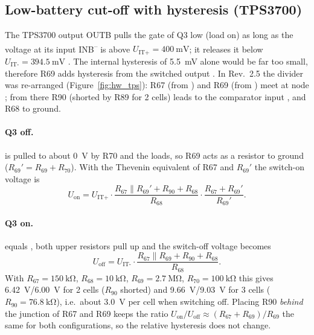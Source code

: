\begin{otherlanguage}{english}
\subsection{Low-battery cut-off with hysteresis (TPS3700)}
\label{sec:hw_tps}
The TPS3700 output OUTB pulls the gate of Q3 low (load on) as long as the voltage at its input
INB\textsuperscript{--} is above $U_\text{IT+}=\SI{400}{\milli\volt}$; it releases it below
$U_\text{IT-}=\SI{394.5}{\milli\volt}$ \cite{TI_TPS3700}. The internal hysteresis of \SI{5.5}{\milli\volt}
alone would be far too small, therefore R69 adds hysteresis from the switched output .
In Rev.~2.5 the divider was re-arranged (Figure~\ref{fig:hw_tps}): R67 (from ) and R69
(from ) meet at node ; from there R90 (shorted by R89 for 2 cells) leads to the
comparator input , and R68 to ground.

\paragraph{Q3 off.}  is pulled to about \SI{0}{\volt} by R70 and the loads, so R69 acts as a
resistor to ground ($R_{69}' = R_{69}+R_{70}$). With the Thevenin equivalent of R67 and $R_{69}'$ the
switch-on voltage is
\begin{equation}
  U_\text{on} = U_\text{IT+}\cdot\frac{R_{67}\parallel R_{69}' + R_{90} + R_{68}}{R_{68}}\cdot\frac{R_{67}+R_{69}'}{R_{69}'} .
\end{equation}
\paragraph{Q3 on.}  equals , both upper resistors pull up and the switch-off
voltage becomes
\begin{equation}
  U_\text{off} = U_\text{IT-}\cdot\frac{R_{67}\parallel R_{69} + R_{90} + R_{68}}{R_{68}} .
\end{equation}
With $R_{67}=\SI{150}{\kilo\ohm}$, $R_{68}=\SI{10}{\kilo\ohm}$, $R_{69}=\SI{2.7}{\mega\ohm}$,
$R_{70}=\SI{100}{\kilo\ohm}$ this gives \SI{6.42}{\volt}/\SI{6.00}{\volt} for 2 cells ($R_{90}$ shorted)
and \SI{9.66}{\volt}/\SI{9.03}{\volt} for 3 cells ($R_{90}=\SI{76.8}{\kilo\ohm}$), i.e.\ about
\SI{3.0}{\volt} per cell when switching off. Placing R90 \emph{behind} the junction of R67 and R69 keeps the
ratio $U_\text{on}/U_\text{off}\approx (R_{67}+R_{69})/R_{69}$ the same for both configurations, so the
relative hysteresis does not change.


\end{otherlanguage}
